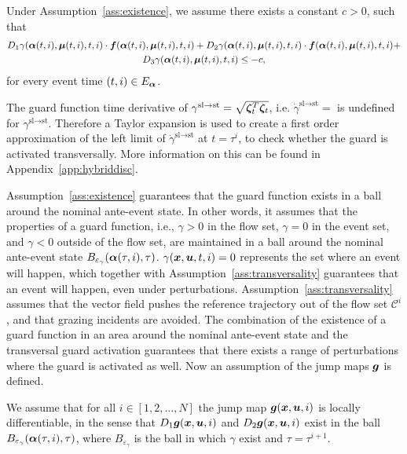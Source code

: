\documentclass[../DC2017114Bouma.tex]{subfiles}
\begin{document}
\begin{myass}\label{ass:transversality}
Under Assumption~\ref{ass:existence}, we assume there exists a constant $c>0$, such that
\begin{multline}
D_1\gamma(\boldsymbol{\alpha}(t,i),\boldsymbol{\mu}(t,i),t,i)\cdot{\boldsymbol{f}}(\boldsymbol{\alpha}(t,i),\boldsymbol{\mu}(t,i),t,i) + D_2\gamma(\boldsymbol{\alpha}(t,i),\boldsymbol{\mu}(t,i),t,i)\cdot{\boldsymbol{f}}(\boldsymbol{\alpha}(t,i),\boldsymbol{\mu}(t,i),t,i) +\\ D_3\gamma(\boldsymbol{\alpha}(t,i),\boldsymbol{\mu}(t,i),t,i) \leq -c,
\end{multline}
for every event time $(t,i) \in E_{\boldsymbol{\alpha}}$.
\end{myass}

\begin{myremark}
The guard function time derivative of $\gamma^{\text{sl}\rightarrow\text{st}} = \sqrt{\boldsymbol{\zeta}_t^T\boldsymbol{\zeta}_t}$, i.e. $\dot{\gamma}^{\text{sl}\rightarrow\text{st}} = $ is undefined for $\gamma^{\text{sl}\rightarrow\text{st}}$. Therefore a Taylor expansion is used to create a first order approximation of the left limit of $\dot{\gamma}^{\text{sl}\rightarrow\text{st}}$ at $t = \tau^i$, to check whether the guard is activated transversally. More information on this can be found in Appendix~\ref{app:hybriddisc}. 
\end{myremark}

Assumption~\ref{ass:existence} guarantees that the guard function exists in a ball around the nominal ante-event state. In other words, it assumes that the properties of a guard function, i.e., $\gamma>0$ in the flow set, $\gamma=0$ in the event set, and $\gamma<0$ outside of the flow set, are maintained in a ball around the nominal ante-event state $B_{\varepsilon_\gamma}(\boldsymbol{\alpha}(\tau,i),\tau)$.  $\gamma({\boldsymbol{x}},{\boldsymbol{u}},t,i) = 0$ represents the set where an event will happen, which together with Assumption~\ref{ass:transversality} guarantees that an event will happen, even under perturbations. Assumption~\ref{ass:transversality} assumes that the vector field pushes the reference trajectory out of the flow set $\mathcal{C}^i$, and that grazing incidents are avoided. The combination of the existence of a guard function in an area around the nominal ante-event state and the transversal guard activation guarantees that there exists a range of perturbations where the guard is activated as well. Now an assumption of the jump maps ${\boldsymbol{g}}$ is defined.

\begin{myass}\label{ass:jump}
We assume that for all $i \in [1,2,...,N]$ the jump map ${\boldsymbol{g}}({\boldsymbol{x}},{\boldsymbol{u}},i)$ is locally differentiable, in the sense that $D_1{\boldsymbol{g}}({\boldsymbol{x}},{\boldsymbol{u}},i)$ and $D_2{\boldsymbol{g}}({\boldsymbol{x}},{\boldsymbol{u}},i)$ exist in the ball $B_{\varepsilon_{\gamma}}(\boldsymbol{\alpha}(\tau,i),\tau)$, where $B_{\varepsilon_{\gamma}}$ is the ball in which $\gamma$ exist and $\tau = \tau^{i+1}$.
\end{myass}
\end{document}
